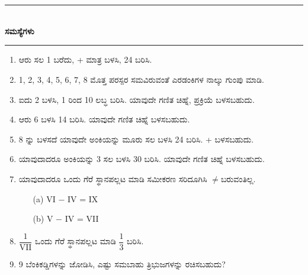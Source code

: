 \chapter{}\label{chap1}

\begin{center}
\rule{5cm}{1pt}\\[5pt]
{\Large\bfseries ಸಮಸ್ಯೆಗಳು}\\[3pt]
\rule{5cm}{1pt}
\end{center}

\smallskip
\begin{enumerate}
\renewcommand{\labelenumi}{\bf\theenumi.}
\itemsep=5pt
\item ಆರು ಸಲ 1 ಬರೆದು, + ಮಾತ್ರ ಬಳಸಿ, 24 ಬರಿಸಿ.

\item 1, 2, 3, 4, 5, 6, 7, 8 ಮೊತ್ತ ಪರಸ್ಪರ ಸಮವಿರುವಂತೆ ಎರಡಂಕಿಗಳ ನಾಲ್ಕು ಗುಂಪು ಮಾಡಿ.

\item ಐದು 2 ಬಳಸಿ, 1 ರಿಂದ 10 ಲಬ್ಧ ಬರಿಸಿ. ಯಾವುದೇ ಗಣಿತ ಚಿಹ್ನೆ, ಪ್ರಕ್ರಿಯೆ ಬಳಸ\-ಬಹುದು.

\item ಆರು 6 ಬಳಸಿ 14 ಬರಿಸಿ. ಯಾವುದೇ ಗಣಿತ ಚಿಹ್ನೆ ಬಳಸಬಹುದು.

\item 8 ನ್ನು  ಬಳಸದೆ ಯಾವುದೇ ಅಂಕಿಯನ್ನು ಮೂರು ಸಲ ಬಳಸಿ 24 ಬರಿಸಿ. + ಬಳಸಬಹುದು.

\item ಯಾವುದಾದರೂ ಅಂಕಿಯನ್ನು 3 ಸಲ ಬಳಸಿ 30 ಬರಿಸಿ. ಯಾವುದೇ ಗಣಿತ ಚಿಹ್ನೆ ಬಳಸ\-ಬಹುದು.

\item ಯಾವುದಾದರೂ ಒಂದು ಗೆರೆ ಸ್ಥಾನಪಲ್ಲಟ ಮಾಡಿ ಸಮೀಕರಣ ಸರಿದೂಗಿಸಿ $\neq$\break ಬರುವಂತಿಲ್ಲ.
\begin{itemize}
\item[(a)] VI $-$ IV = IX

\item[(b)] V $-$ IV = VII
\end{itemize}

\smallskip

\item $\dfrac{1}{\text{VII}}$ ಒಂದು ಗೆರೆ ಸ್ಥಾನಪಲ್ಲಟ ಮಾಡಿ $\dfrac{1}{3}$ ಬರಿಸಿ.

\smallskip

\item 9 ಬೆಂಕಿಕಡ್ಡಿಗಳನ್ನು ಜೋಡಿಸಿ, ಎಷ್ಟು ಸಮಬಾಹು ತ್ರಿಭುಜಗಳನ್ನು ರಚಿಸಬಹುದು?


\end{enumerate}
